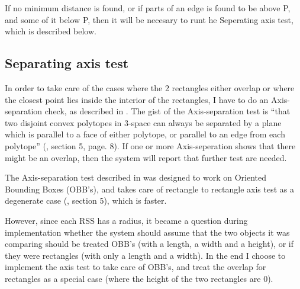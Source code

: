 If no minimum distance is found, or if parts of an edge is found to be above P, and some of it below P, then it will be necesary to runt he Seperating axis test, which is described below.

\subsection{Separating axis test}
\label{sepAxis}
In order to take care of the cases where the 2 rectangles either overlap or where the closest point lies inside the interior of the rectangles, I have to do an Axis-separation check, as described in \cite{237244}. The gist of the Axis-separation test is ``that two disjoint convex polytopes in 3-space can always be separated by a plane which is parallel to a face of either polytope, or parallel to an edge from each polytope'' (\cite{237244}, section 5, page. 8). If one or more Axis-seperation shows that there might be an overlap, then the system will report that further test are needed.

The Axis-separation test described in \cite{237244} was designed to work on Oriented Bounding Boxes (OBB's), and takes care of rectangle to rectangle axis test as a degenerate case (\cite{237244}, section 5), which is faster. 

However, since each RSS has a radius, it became a question during implementation whether the system should assume that the two objects it was comparing should be treated OBB's (with a length, a width and a height), or if they were rectangles (with only a length and a width). In the end I choose to implement the axis test to take care of OBB's, and treat the overlap for rectangles as a special case (where the height of the two rectangles are 0).

